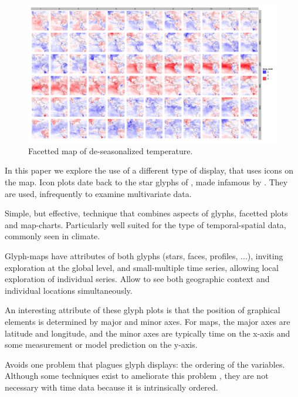 \documentclass[oneside]{article}
\begin{document}
\begin{figure}[htp]
\centerline{\includegraphics[width=6in]{nasa-colored-map.png}}
\caption{Facetted map of de-seasonalized temperature.}
\label{fig:facetted-map}
\end{figure}

In this paper we explore the use of a different type of display, that uses icons on the map. Icon plots date back to the star glyphs of  \citep{kleiner}, made infamous by \citep{Chernoff}. They are used, infrequently to examine multivariate data.


Simple, but effective, technique that combines aspects of glyphs, facetted plots and map-charts. Particularly well suited for the type of temporal-spatial data, commonly seen in climate.

Glyph-maps have attributes of both glyphs (stars, faces, profiles, ...), inviting exploration at the global level, and small-multiple time series, allowing local exploration of individual series. Allow to see both geographic context and individual locations simultaneously.

An interesting attribute of these glyph plots is that the position of graphical elements is determined by major and minor axes. For maps, the major axes are latitude and longitude, and the minor axes are typically time on the x-axis and some measurement or model prediction on the y-axis.

Avoids one problem that plagues glyph displays: the ordering of the variables. Although some techniques exist to ameliorate this problem \citep{kleiner:1981,hurley:2010}, they are not necessary with time data because it is intrinsically ordered.
\end{document}
